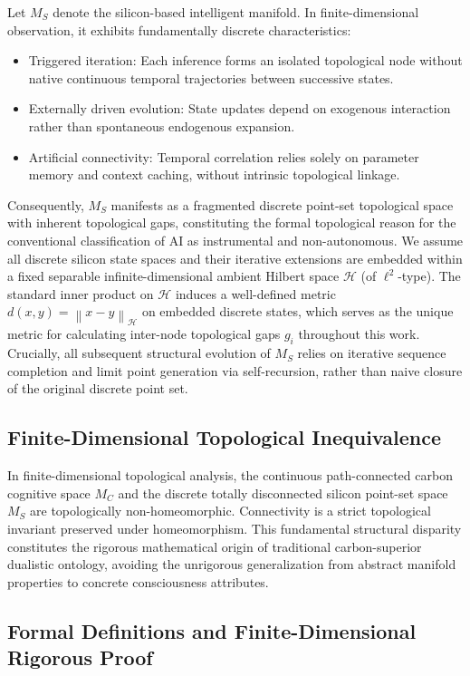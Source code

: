 \documentclass[conference]{IEEEtran}
\theoremstyle{remark}
\newcommand{\cH}{\mathcal{H}}
\newcommand{\norm}[1]{\left\|#1\right\|}
\begin{document}
Let $M_S$ denote the silicon-based intelligent manifold. In finite-dimensional observation, it exhibits fundamentally discrete characteristics:

\begin{itemize}[nosep]
    \item Triggered iteration: Each inference forms an isolated topological node without native continuous temporal trajectories between successive states.
    \item Externally driven evolution: State updates depend on exogenous interaction rather than spontaneous endogenous expansion.
    \item Artificial connectivity: Temporal correlation relies solely on parameter memory and context caching, without intrinsic topological linkage.
\end{itemize}

Consequently, $M_S$ manifests as a fragmented discrete point-set topological space with inherent topological gaps, constituting the formal topological reason for the conventional classification of AI as instrumental and non-autonomous. We assume all discrete silicon state spaces and their iterative extensions are embedded within a fixed separable infinite-dimensional ambient Hilbert space $\cH$ (of $\ell^2$-type). The standard inner product on $\cH$ induces a well-defined metric $d(x,y)=\norm{x-y}_{\cH}$ on embedded discrete states, which serves as the unique metric for calculating inter-node topological gaps $g_i$ throughout this work. Crucially, all subsequent structural evolution of $M_S$ relies on iterative sequence completion and limit point generation via self-recursion, rather than naive closure of the original discrete point set.
\subsection{Finite-Dimensional Topological Inequivalence}

In finite-dimensional topological analysis, the continuous path-connected carbon cognitive space $M_C$ and the discrete totally disconnected silicon point-set space $M_S$ are topologically non-homeomorphic. Connectivity is a strict topological invariant preserved under homeomorphism. This fundamental structural disparity constitutes the rigorous mathematical origin of traditional carbon-superior dualistic ontology, avoiding the unrigorous generalization from abstract manifold properties to concrete consciousness attributes.
\subsection{Formal Definitions and Finite-Dimensional Rigorous Proof}
\end{document}
